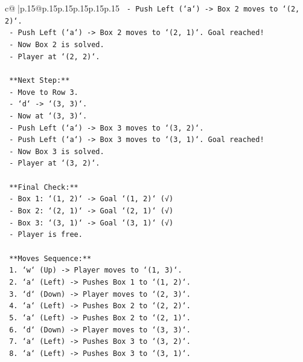 \documentclass{article}
\begin{document}
{\begin{supertabular}{c@{$\;$}|p{.15\linewidth}@{}p{.15\linewidth}p{.15\linewidth}p{.15\linewidth}p{.15\linewidth}p{.15\linewidth}}
{{{\texttt{        {-} Push Left (`a`) {-}> Box 2 moves to `(2, 2)`.} \\
\texttt{        {-} Push Left (`a`) {-}> Box 2 moves to `(2, 1)`. Goal reached!} \\
\texttt{        {-} Now Box 2 is solved.} \\
\texttt{        {-} Player at `(2, 2)`.} \\
\\ 
\texttt{        **Next Step:**} \\
\texttt{        {-} Move to Row 3.} \\
\texttt{        {-} `d` {-}> `(3, 3)`.} \\
\texttt{        {-} Now at `(3, 3)`.} \\
\texttt{        {-} Push Left (`a`) {-}> Box 3 moves to `(3, 2)`.} \\
\texttt{        {-} Push Left (`a`) {-}> Box 3 moves to `(3, 1)`. Goal reached!} \\
\texttt{        {-} Now Box 3 is solved.} \\
\texttt{        {-} Player at `(3, 2)`.} \\
\\ 
\texttt{    **Final Check:**} \\
\texttt{    {-} Box 1: `(1, 2)` {-}> Goal `(1, 2)` (√)} \\
\texttt{    {-} Box 2: `(2, 1)` {-}> Goal `(2, 1)` (√)} \\
\texttt{    {-} Box 3: `(3, 1)` {-}> Goal `(3, 1)` (√)} \\
\texttt{    {-} Player is free.} \\
\\ 
\texttt{    **Moves Sequence:**} \\
\texttt{    1.  `w` (Up) {-}> Player moves to `(1, 3)`.} \\
\texttt{    2.  `a` (Left) {-}> Pushes Box 1 to `(1, 2)`.} \\
\texttt{    3.  `d` (Down) {-}> Player moves to `(2, 3)`.} \\
\texttt{    4.  `a` (Left) {-}> Pushes Box 2 to `(2, 2)`.} \\
\texttt{    5.  `a` (Left) {-}> Pushes Box 2 to `(2, 1)`.} \\
\texttt{    6.  `d` (Down) {-}> Player moves to `(3, 3)`.} \\
\texttt{    7.  `a` (Left) {-}> Pushes Box 3 to `(3, 2)`.} \\
\texttt{    8.  `a` (Left) {-}> Pushes Box 3 to `(3, 1)`.} \\
\\ 
}}}
\end{supertabular}}
\end{document}
